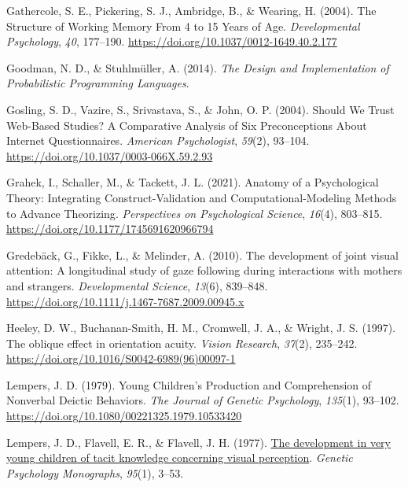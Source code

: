 \documentclass[
  man,mask,floatsintext]{apa6}
\newlength{\cslhangindent}
\newlength{\cslentryspacingunit} %
\newenvironment{CSLReferences}[2] %
 {%
  \setlength{\parindent}{0pt}
  \ifodd #1
  \let\oldpar\par
  \def\par{\hangindent=\cslhangindent\oldpar}
  \fi
  \setlength{\parskip}{#2\cslentryspacingunit}
 }%
 {}
\begin{document}
\begin{CSLReferences}{1}{0}
\leavevmode{}%
Gathercole, S. E., Pickering, S. J., Ambridge, B., \& Wearing, H. (2004). The {Structure} of {Working Memory From} 4 to 15 {Years} of {Age}. \emph{Developmental Psychology}, \emph{40}, 177--190. \url{https://doi.org/10.1037/0012-1649.40.2.177}

\leavevmode{}%
Goodman, N. D., \& Stuhlmüller, A. (2014). \emph{The {Design} and {Implementation} of {Probabilistic Programming Languages}}.

\leavevmode{}%
Gosling, S. D., Vazire, S., Srivastava, S., \& John, O. P. (2004). Should {We Trust Web-Based Studies}? {A Comparative Analysis} of {Six Preconceptions About Internet Questionnaires}. \emph{American Psychologist}, \emph{59}(2), 93--104. \url{https://doi.org/10.1037/0003-066X.59.2.93}

\leavevmode{}%
Grahek, I., Schaller, M., \& Tackett, J. L. (2021). Anatomy of a {Psychological Theory}: {Integrating Construct-Validation} and {Computational-Modeling Methods} to {Advance Theorizing}. \emph{Perspectives on Psychological Science}, \emph{16}(4), 803--815. \url{https://doi.org/10.1177/1745691620966794}

\leavevmode{}%
Gredebäck, G., Fikke, L., \& Melinder, A. (2010). The development of joint visual attention: A longitudinal study of gaze following during interactions with mothers and strangers. \emph{Developmental Science}, \emph{13}(6), 839--848. \url{https://doi.org/10.1111/j.1467-7687.2009.00945.x}

\leavevmode{}%
Heeley, D. W., Buchanan-Smith, H. M., Cromwell, J. A., \& Wright, J. S. (1997). The oblique effect in orientation acuity. \emph{Vision Research}, \emph{37}(2), 235--242. \url{https://doi.org/10.1016/S0042-6989(96)00097-1}

\leavevmode{}%
Lempers, J. D. (1979). Young {Children}'s {Production} and {Comprehension} of {Nonverbal Deictic Behaviors}. \emph{The Journal of Genetic Psychology}, \emph{135}(1), 93--102. \url{https://doi.org/10.1080/00221325.1979.10533420}

\leavevmode{}%
Lempers, J. D., Flavell, E. R., \& Flavell, J. H. (1977). \href{https://www.ncbi.nlm.nih.gov/pubmed/849832}{The development in very young children of tacit knowledge concerning visual perception}. \emph{Genetic Psychology Monographs}, \emph{95}(1), 3--53.


\end{CSLReferences}
\end{document}
